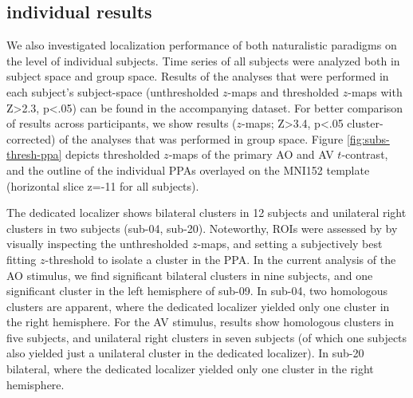 \documentclass[english]{article}
\begin{document}
\subsection{individual results}
We also investigated localization performance of both naturalistic paradigms on
the level of individual subjects. 
Time series of all subjects were analyzed both in subject space and group space.
Results of the analyses that were performed in each subject's subject-space
(unthresholded $z$-maps and thresholded $z$-maps with Z>2.3, p<.05) can be
found in the accompanying dataset.
For better comparison of results across participants, we show results ($z$-maps;
Z>3.4, p<.05 cluster-corrected) of the analyses that was performed in group
space.
Figure \ref{fig:subs-thresh-ppa} depicts thresholded $z$-maps of the primary AO
and AV $t$-contrast, and the outline of the individual PPAs
\citep{sengupta2016extension} overlayed on the MNI152 template (horizontal slice
z=-11 for all subjects).

The dedicated localizer shows bilateral clusters in 12 subjects and unilateral
right clusters in two subjects (sub-04, sub-20).
Noteworthy, ROIs were assessed by \citep{sengupta2016extension} by visually
inspecting the unthresholded $z$-maps, and setting a subjectively best fitting
$z$-threshold to isolate a cluster in the PPA.
In the current analysis of the AO stimulus, we find significant bilateral
clusters in nine subjects, and one significant cluster in the left hemisphere of sub-09.
In sub-04, two homologous clusters are apparent, where the dedicated localizer
yielded only one cluster in the right hemisphere.
For the AV stimulus, results show homologous clusters in five subjects, and
unilateral right clusters in seven subjects (of which one subjects also yielded
just a unilateral cluster in the dedicated localizer).
In sub-20 bilateral, where the dedicated localizer yielded only one cluster in
the right hemisphere.
\end{document}
